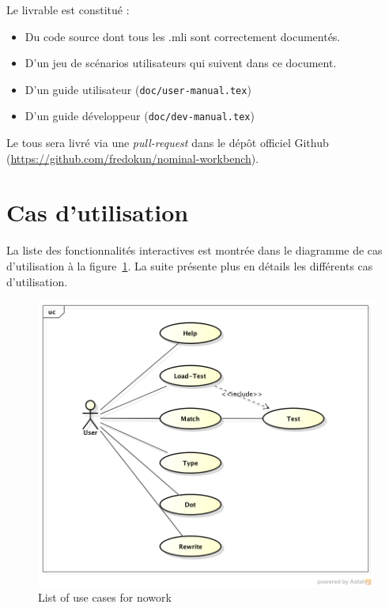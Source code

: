 \documentclass[12pt,a4paper]{article}
\begin{document}
Le livrable est constitué :
\newline

\begin{itemize}
\item Du code source dont tous les .mli sont correctement documentés.
\item D'un jeu de scénarios utilisateurs qui suivent dans ce document.
\item D'un guide utilisateur (\verb=doc/user-manual.tex=)
\item D'un guide développeur (\verb=doc/dev-manual.tex=)
\end{itemize}
\vspace{10pt}

Le tous sera livré via une \textit{pull-request} dans le dépôt officiel Github (\url{https://github.com/fredokun/nominal-workbench}).


\section{Cas d'utilisation}

La liste des fonctionnalités interactives est montrée dans le diagramme de cas
d'utilisation à la figure~\ref{use-cases}. La suite présente plus en détails les différents cas d'utilisation.

\begin{figure}[h!]
  \centering
  \includegraphics[width=\linewidth,natwidth=\linewidth,natheight=\textheight]{use-case-diagram.png}
  \caption{List of use cases for nowork}
  \label{use-cases}
\end{figure}
\end{document}
